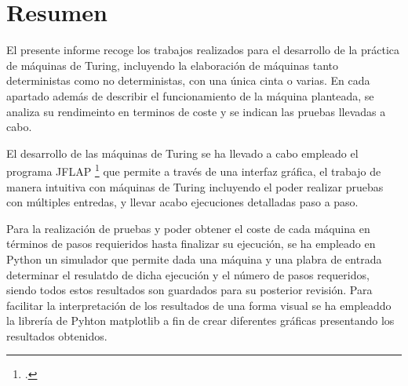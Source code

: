 \part{Resumen}

El presente informe recoge los trabajos realizados para el desarrollo de la práctica de máquinas de Turing, incluyendo la elaboración de máquinas tanto deterministas como no deterministas, con una única cinta o varias. En cada apartado además de describir el funcionamiento de la máquina planteada, se analiza su rendimeinto en terminos de coste y se indican las pruebas llevadas a cabo.\medskip

El desarrollo de las máquinas de Turing se ha llevado a cabo empleado el programa JFLAP \footcite{jflap} que permite a través de una interfaz gráfica, el trabajo de manera intuitiva con máquinas de Turing incluyendo el poder realizar pruebas con múltiples entredas, y llevar acabo ejecuciones detalladas paso a paso.\medskip

Para la realización de pruebas y poder obtener el coste de cada máquina en términos de pasos requieridos hasta finalizar su ejecución, se ha empleado en Python un simulador que permite dada una máquina y una plabra de entrada determinar el resulatdo de dicha ejecución y el número de pasos requeridos, siendo todos estos resultados son guardados para su posterior revisión. Para facilitar la interpretación de los resultados de una forma visual se ha empleaddo la librería de Pyhton matplotlib\supercite{matplotlib} a fin de crear diferentes gráficas presentando los resultados obtenidos.

